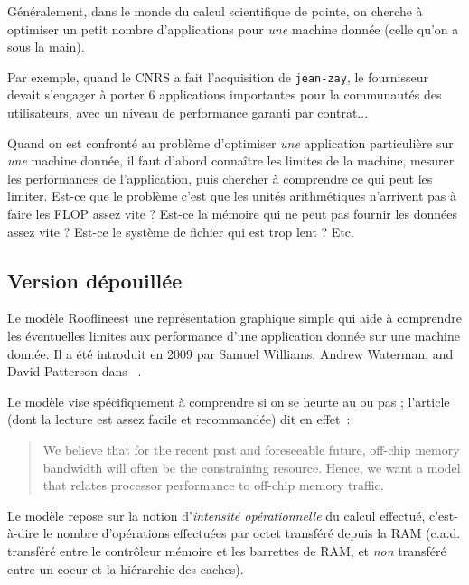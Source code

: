 Généralement, dans le monde du calcul scientifique de pointe, on cherche à
optimiser un petit nombre d'applications pour \emph{une} machine donnée (celle
qu'on a sous la main).

\begin{danger}
  Par exemple, quand le CNRS a fait l'acquisition de \texttt{jean-zay}, le
  fournisseur devait s'engager à porter 6 applications importantes pour la
  communautés des utilisateurs, avec un niveau de performance garanti par
  contrat...
\end{danger}

Quand on est confronté au problème d'optimiser \emph{une} application
particulière sur \emph{une} machine donnée, il faut d'abord connaître les
limites de la machine, mesurer les performances de l'application, puis chercher
à comprendre ce qui peut les limiter. Est-ce que le problème c'est que les
unités arithmétiques n'arrivent pas à faire les FLOP assez vite ? Est-ce la
mémoire qui ne peut pas fournir les données assez vite ?  Est-ce le système de
fichier qui est trop lent ? Etc.

\subsection{Version dépouillée}

Le modèle \og Roofline\fg est une représentation graphique simple qui aide à
comprendre les éventuelles limites aux performance d'une application donnée sur
une machine donnée. Il a été introduit en 2009 par Samuel Williams, Andrew
Waterman, and David Patterson dans \og {}\fg~\cite{WilliamsWP09}.

Le modèle vise spécifiquement à comprendre si on se heurte au  ou pas ; l'article (dont la lecture est assez facile et recommandée) dit
en effet~:
\begin{quote}
  We believe that for the recent past and foreseeable future, off-chip memory
  bandwidth will often be the constraining resource. Hence, we want a model that
  relates processor performance to off-chip memory traffic.
\end{quote}

Le modèle repose sur la notion d'\emph{intensité opérationnelle} du calcul
effectué, c'est-à-dire le nombre d'opérations effectuées par octet transféré
depuis la RAM (c.a.d. transféré entre le contrôleur mémoire et les barrettes de
RAM, et \emph{non} transféré entre un coeur et la hiérarchie des caches).

